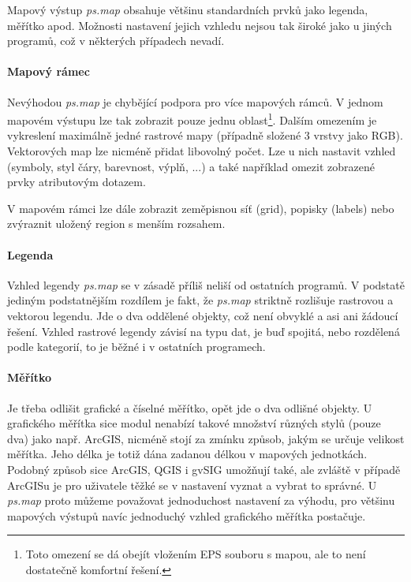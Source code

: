 \documentclass[a4paper,12pt,draft]{article}
\newcommand{\modul}[1]{\emph{#1}}
\begin{document}
Mapový výstup \modul{ps.map} obsahuje většinu standardních prvků jako legenda, měřítko apod. Možnosti nastavení jejich vzhledu nejsou tak široké jako u jiných programů, což v některých případech nevadí.

\paragraph*{Mapový rámec}
Nevýhodou \modul{ps.map} je chybějící podpora pro více mapových rámců. V jednom mapovém výstupu lze tak zobrazit pouze jednu oblast\footnote{Toto omezení se dá obejít vložením EPS souboru s mapou, ale to není dostatečně komfortní řešení.}. Dalším omezením je vykreslení maximálně jedné rastrové mapy (případně složené 3 vrstvy jako RGB). Vektorových map lze nicméně přidat libovolný počet. Lze u nich nastavit vzhled (symboly, styl čáry, barevnost, výplň, ...) a také například omezit zobrazené prvky atributovým dotazem.

V mapovém rámci lze dále zobrazit zeměpisnou síť (grid), popisky (labels) nebo zvýraznit uložený region s menším rozsahem.

\paragraph*{Legenda}
Vzhled legendy \modul{ps.map} se v zásadě příliš neliší od ostatních programů. V podstatě jediným podstatnějším rozdílem je fakt, že \modul{ps.map} striktně rozlišuje rastrovou a vektorou legendu. Jde o dva oddělené objekty, což není obvyklé a asi ani žádoucí řešení. Vzhled rastrové legendy závisí na typu dat, je buď spojitá, nebo rozdělená podle kategorií, to je běžné i v ostatních programech.

\paragraph*{Měřítko}
Je třeba odlišit grafické a číselné měřítko, opět jde o dva odlišné objekty.
U grafického měřítka sice modul nenabízí takové množství různých stylů (pouze dva) jako např. ArcGIS, nicméně stojí za zmínku způsob, jakým se určuje velikost měřítka. Jeho délka je totiž dána zadanou délkou v mapových jednotkách. Podobný způsob sice ArcGIS, QGIS i gvSIG umožňují také, ale zvláště v případě ArcGISu je pro uživatele těžké se v nastavení vyznat a vybrat to správné. U \modul{ps.map} proto můžeme považovat jednoduchost nastavení za výhodu, pro většinu mapových výstupů navíc jednoduchý vzhled grafického měřítka postačuje.
\end{document}
